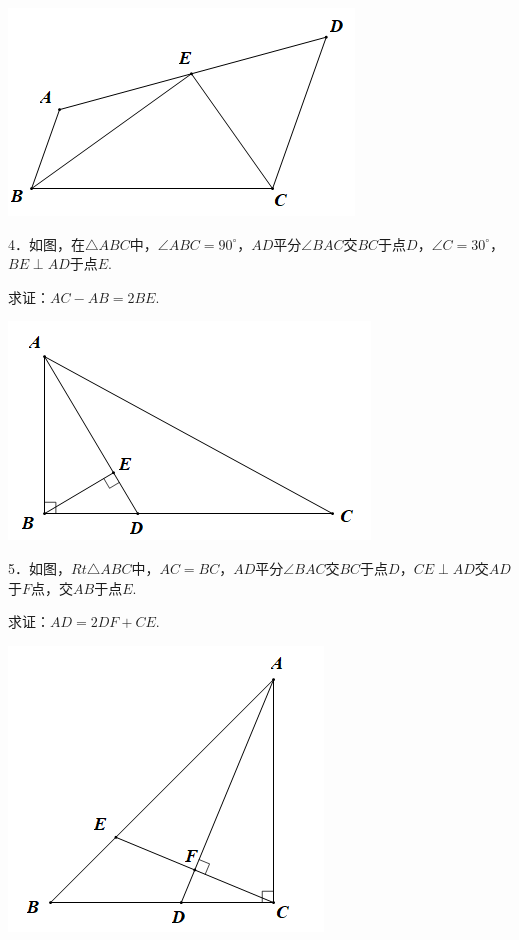 \documentclass[10pt]{ctexart}
\begin{document}
\begin{flushright}
	\includegraphics[scale=0.6]{figure/jiechangbuduan06}
\end{flushright}

\begin{shaded}
	4．如图，在$\triangle ABC$中，$\angle ABC=90^\circ$，$AD$平分$\angle BAC$交$BC$于点$D$，$\angle C=30^\circ$，$BE\perp AD$于点$E$.
	
	求证：$AC-AB=2BE$.
\end{shaded}

\begin{flushright}
	\includegraphics[scale=0.6]{figure/jiechangbuduan07}
\end{flushright}

\begin{shaded}
5．如图，$Rt\triangle ABC$中，$AC=BC$，$AD$平分$\angle BAC$交$BC$于点$D$，$CE\perp AD$交$AD$于$F$点，交$AB$于点$E$.

求证：$AD=2DF+CE$.
\end{shaded}

\begin{flushright}
	\includegraphics[scale=0.6]{figure/jiechangbuduan08}
\end{flushright}
\end{document}
